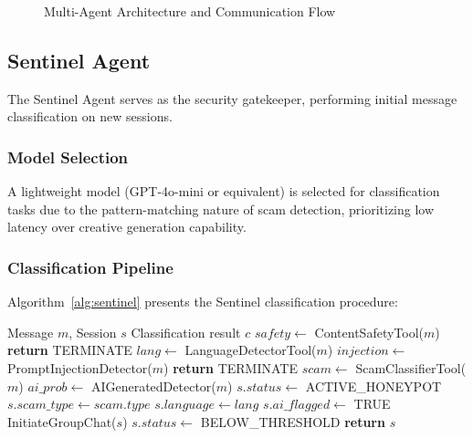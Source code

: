 \documentclass[conference]{IEEEtran}
\begin{document}
\begin{figure}[htbp]
\centerline{}
\caption{Multi-Agent Architecture and Communication Flow}
\label{fig:agents}
\end{figure}

\subsection{Sentinel Agent}

The Sentinel Agent serves as the security gatekeeper, performing initial message classification on new sessions.

\subsubsection{Model Selection}
A lightweight model (GPT-4o-mini or equivalent) is selected for classification tasks due to the pattern-matching nature of scam detection, prioritizing low latency over creative generation capability.

\subsubsection{Classification Pipeline}
Algorithm~\ref{alg:sentinel} presents the Sentinel classification procedure:

\begin{algorithm}[H]
\caption{Sentinel Agent Classification}
\label{alg:sentinel}
\begin{algorithmic}[1]
\REQUIRE Message $m$, Session $s$
\ENSURE Classification result $c$
\STATE $safety \leftarrow$ ContentSafetyTool($m$)
    \STATE \textbf{return} TERMINATE
\ENDIF
\STATE $lang \leftarrow$ LanguageDetectorTool($m$)
\STATE $injection \leftarrow$ PromptInjectionDetector($m$)
    \STATE \textbf{return} TERMINATE
\ENDIF
\STATE $scam \leftarrow$ ScamClassifierTool($m$)
\STATE $ai\_prob \leftarrow$ AIGeneratedDetector($m$)
    \STATE $s.status \leftarrow$ ACTIVE\_HONEYPOT
    \STATE $s.scam\_type \leftarrow scam.type$
    \STATE $s.language \leftarrow lang$
        \STATE $s.ai\_flagged \leftarrow$ TRUE
    \ENDIF
    \STATE InitiateGroupChat($s$)
\ELSE
    \STATE $s.status \leftarrow$ BELOW\_THRESHOLD
\ENDIF
\STATE \textbf{return} $s$
\end{algorithmic}
\end{algorithm}
\end{document}

